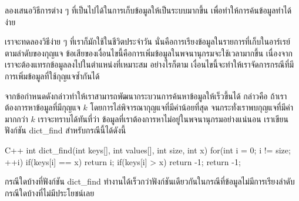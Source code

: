 \begin{quiz}{}
ลอง{\wbr}เสนอ{\wbr}วิธีการ{\wbr}ต่าง ๆ ที่{\wbr}เป็น{\wbr}ไป{\wbr}ได้{\wbr}ใน{\wbr}การ{\wbr}เก็บ{\wbr}ข้อมูล{\wbr}ให้{\wbr}เป็น{\wbr}ระบบ{\wbr}มาก{\wbr}ขึ้น{\wbr}
เพื่อ{\wbr}ทำ{\wbr}ให้การ{\wbr}ค้น{\wbr}ข้อมูล{\wbr}ทำ{\wbr}ได้{\wbr}ง่าย{\wbr}
\end{quiz}

เรา{\wbr}จะ{\wbr}ทดลอง{\wbr}วิธี{\wbr}ง่าย ๆ ที่{\wbr}เรา{\wbr}ก็{\wbr}มัก{\wbr}ใช้{\wbr}ใน{\wbr}ชีวิต{\wbr}ประจำวัน{\wbr}
นั่น{\wbr}คือ{\wbr}การ{\wbr}เรียง{\wbr}ข้อมูล{\wbr}ใน{\wbr}รายการ{\wbr}ที่{\wbr}เก็บ{\wbr}ใน{\wbr}อาร์เรย์{\wbr}ตาม{\wbr}ลำดับ{\wbr}ของ{\wbr}กุญแจ{\wbr}
ข้อเสีย{\wbr}ของ{\wbr}เงื่อนไข{\wbr}นี้{\wbr}คือ{\wbr}การ{\wbr}เพิ่ม{\wbr}ข้อมูล{\wbr}ใน{\wbr}พจนานุกรม{\wbr}จะ{\wbr}ใช้เวลา{\wbr}มาก{\wbr}ขึ้น{\wbr}
เนื่องจาก{\wbr}เรา{\wbr}จะ{\wbr}ต้อง{\wbr}แทรก{\wbr}ข้อมูล{\wbr}ลง{\wbr}ไป{\wbr}ใน{\wbr}ตำแหน่ง{\wbr}ที่{\wbr}เหมาะสม อย่างไรก็ตาม{\wbr}
เงื่อนไข{\wbr}นี้{\wbr}จะ{\wbr}ทำ{\wbr}ให้{\wbr}เรา{\wbr}จัดการ{\wbr}กรณี{\wbr}ที่{\wbr}มี{\wbr}การ{\wbr}เพิ่ม{\wbr}ข้อมูล{\wbr}ที่{\wbr}ใช้{\wbr}กุญแจ{\wbr}ซ้ำ{\wbr}กัน{\wbr}ได้{\wbr}

จาก{\wbr}ข้อกำหนด{\wbr}ดังกล่าว{\wbr}ทำ{\wbr}ให้{\wbr}เรา{\wbr}สามารถ{\wbr}พัฒนา{\wbr}กระบวนการ{\wbr}ค้นหา{\wbr}ข้อมูล{\wbr}ให้{\wbr}เร็ว{\wbr}ขึ้น{\wbr}ได้ กล่าวคือ{\wbr}
ถ้า{\wbr}เรา{\wbr}ต้องการ{\wbr}หา{\wbr}ข้อมูล{\wbr}ที่{\wbr}มี{\wbr}กุญแจ $k$ โดย{\wbr}การ{\wbr}ไล่{\wbr}พิจารณา{\wbr}กุญแจ{\wbr}ที่{\wbr}มี{\wbr}ค่า{\wbr}น้อย{\wbr}ที่สุด{\wbr}
จนกระทั่ง{\wbr}เรา{\wbr}พบ{\wbr}กุญแจ{\wbr}ที่{\wbr}มี{\wbr}ค่า{\wbr}มาก{\wbr}กว่า $k$ เรา{\wbr}จะ{\wbr}ทราบ{\wbr}ได้{\wbr}ทัน{\wbr}ที่{\wbr}ว่า{\wbr}
ข้อมูล{\wbr}ที่{\wbr}เรา{\wbr}ต้องการ{\wbr}หาไม่{\wbr}อยู่{\wbr}ใน{\wbr}พจนานุกรม{\wbr}อย่าง{\wbr}แน่นอน เรา{\wbr}เขียน{\wbr}ฟังก์ชัน {\ct dict\_find}
สำหรับ{\wbr}กรณี{\wbr}นี้{\wbr}ได้{\wbr}ดังนี้{\wbr}

\latintext
\begin{codelist}{C++}{}
int dict_find(int keys[], int values[], int size, int x)
{
  for(int i = 0; i != size; ++i) {
    if(keys[i] == x)
      return i;
    if(keys[i] > x)
      return -1;
  }
  return -1; 
}
\end{codelist}
\thaitext

\begin{quiz}{}
กรณี{\wbr}ใด{\wbr}บ้าง{\wbr}ที่{\wbr}ฟังก์ชัน {\ct dict\_find}
ทำงาน{\wbr}ได้{\wbr}เร็ว{\wbr}กว่า{\wbr}ฟังก์ชัน{\wbr}เดียวกัน{\wbr}ใน{\wbr}กรณี{\wbr}ที่{\wbr}ข้อมูล{\wbr}ไม่{\wbr}มี{\wbr}การ{\wbr}เรียงลำดับ{\wbr}
กรณี{\wbr}ใด{\wbr}บ้าง{\wbr}ที่{\wbr}ไม่{\wbr}มี{\wbr}ประโยชน์{\wbr}เลย{\wbr}
\end{quiz}

